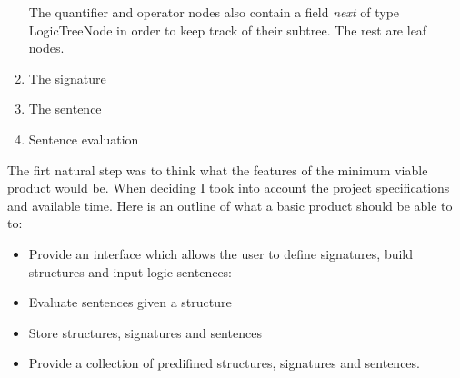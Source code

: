 \documentclass{article}
\begin{document}
\begin{enumerate}
\noindent The quantifier and operator nodes also contain a field \emph{next} of type LogicTreeNode in order to keep track of their subtree. The rest are leaf nodes.\\

\noindent 

	\item The signature %
	\item The sentence %
	\item Sentence evaluation %
	\end{enumerate}





The firt natural step was to think what the features of the minimum viable product would be. When deciding I took into account the project specifications and available time. Here is an outline of what a basic product should be able to to:
\begin{itemize}
	\item Provide an interface which allows the user to define signatures, build structures and input logic sentences:\\
	
	\item Evaluate sentences given a structure
	\item Store structures, signatures and sentences
	\item Provide a collection of predifined structures, signatures and sentences.
\end{itemize}

\end{document}
